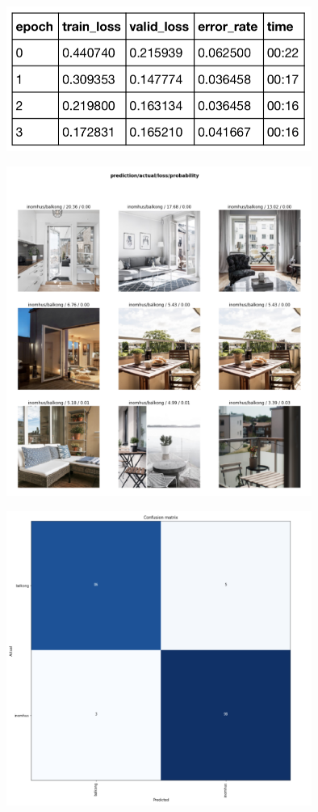 \documentclass{kththesis}
\begin{document}
\includegraphics[width=10cm]{../images/2.png}

\includegraphics[width=10cm]{../images/3.png}

\includegraphics[width=10cm]{../images/4.png}
\end{document}
